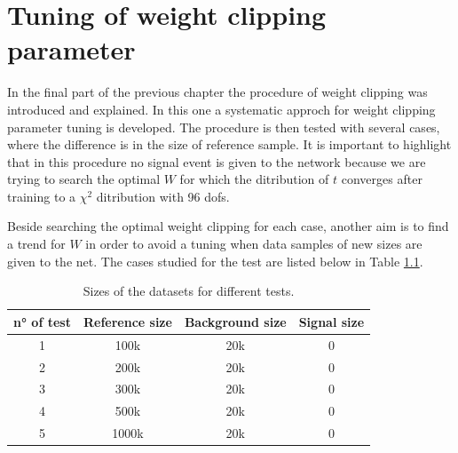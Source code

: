 \chapter{Tuning of weight clipping parameter}
\label{chap:W_CLIP}





In the final part of the previous chapter the procedure of weight clipping was introduced and explained. In this one a systematic approch for weight clipping parameter tuning is developed. The procedure is then tested with several cases, where the difference is in the size of reference sample. It is important to highlight that in this procedure no signal event is given to the network because we are trying to search the optimal $W$ for which the ditribution of $t$ converges after training to a $\chi^2$ ditribution with 96 dofs.

Beside searching the optimal weight clipping for each case, another aim is to find a trend for $W$ in order to avoid a tuning when data samples of new sizes are given to the net. The cases studied for the test are listed below in Table \ref{tab:W_CLIP_TEST_SIZES}.

\begin{table}[H]
	\centering
	\begin{tabular}{c c c c}
		\toprule
		n° of test	&	Reference size	&	Background size	&	Signal size	\\
		\midrule
		1			&	100k			&	20k				&	0			\\
		2			&	200k			&	20k				&	0			\\
		3			&	300k			&	20k				&	0			\\
		4			&	500k			&	20k				&	0			\\
		5			&	1000k			&	20k				&	0			\\
		\bottomrule
	\end{tabular}
	\caption{Sizes of the datasets for different tests.}
	\label{tab:W_CLIP_TEST_SIZES}
\end{table}






